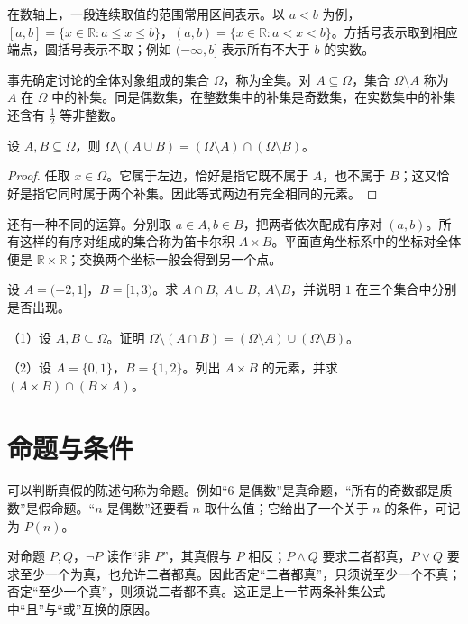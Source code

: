 在数轴上，一段连续取值的范围常用区间表示。以 \(a<b\) 为例，\([a,b]=\{x\in\mathbb R:a\le x\le b\}\)，\((a,b)=\{x\in\mathbb R:a<x<b\}\)。方括号表示取到相应端点，圆括号表示不取；例如 \((-\infty,b]\) 表示所有不大于 \(b\) 的实数。

事先确定讨论的全体对象组成的集合 \(\Omega\)，称为{\heiti{}全集}。对 \(A\subseteq\Omega\)，集合 \(\Omega\setminus A\) 称为 \(A\) 在 \(\Omega\) 中的{\heiti{}补集}。同是偶数集，在整数集中的补集是奇数集，在实数集中的补集还含有 \(\tfrac12\) 等非整数。
\begin{proposition}
设 \(A,B\subseteq\Omega\)，则 \(\Omega\setminus(A\cup B)=(\Omega\setminus A)\cap(\Omega\setminus B)\)。
\end{proposition}
\begin{proof}
任取 \(x\in\Omega\)。它属于左边，恰好是指它既不属于 \(A\)，也不属于 \(B\)；这又恰好是指它同时属于两个补集。因此等式两边有完全相同的元素。
\end{proof}

还有一种不同的运算。分别取 \(a\in A,b\in B\)，把两者依次配成有序对 \((a,b)\)。所有这样的有序对组成的集合称为{\heiti{}笛卡尔积} \(A\times B\)。平面直角坐标系中的坐标对全体便是 \(\mathbb R\times\mathbb R\)；交换两个坐标一般会得到另一个点。

\begin{example}
设 \(A=(-2,1]\)，\(B=[1,3)\)。求 \(A\cap B,\ A\cup B,\ A\setminus B\)，并说明 \(1\) 在三个集合中分别是否出现。
\end{example}

\begin{exercise}
\mbox{}\par\nobreak

（1）设 \(A,B\subseteq\Omega\)。证明 \(\Omega\setminus(A\cap B)=(\Omega\setminus A)\cup(\Omega\setminus B)\)。

（2）设 \(A=\{0,1\}\)，\(B=\{1,2\}\)。列出 \(A\times B\) 的元素，并求 \((A\times B)\cap(B\times A)\)。
\end{exercise}

\section{命题与条件}
可以判断真假的陈述句称为{\heiti{}命题}。例如“\(6\) 是偶数”是真命题，“所有的奇数都是质数”是假命题。“\(n\) 是偶数”还要看 \(n\) 取什么值；它给出了一个关于 \(n\) 的条件，可记为 \(P(n)\)。

对命题 \(P,Q\)，\(\neg P\) 读作“非 \(P\)”，其真假与 \(P\) 相反；\(P\land Q\) 要求二者都真，\(P\lor Q\) 要求至少一个为真，也允许二者都真。因此否定“二者都真”，只须说至少一个不真；否定“至少一个真”，则须说二者都不真。这正是上一节两条补集公式中“且”与“或”互换的原因。

